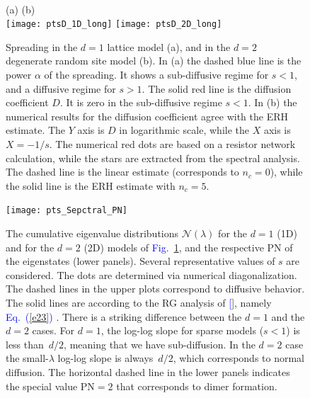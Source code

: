 \documentclass[aps,prb,floats,floatfix,twocolumn]{revtex4}
\newcommand{\Eq}[1]{\textcolor{blue}{Eq.\!\!~(\ref{#1})}}
\newcommand{\Fig}[1]{\textcolor{blue}{Fig.}\!\!~\ref{#1}}
\renewcommand{\cite}[1]{\textcolor{blue}{[\onlinecite{#1}}]} %
\begin{document}
 


\begin{widetext}

\ \\ \ \\ \ \\ \ \\ \ \\ \ \\ 



\begin{figure}[h!]
(a) \hspace{0.5\hsize} (b) \\
\texttt{[image: ptsD\_1D\_long]}
\texttt{[image: ptsD\_2D\_long]}

\caption{Spreading in the $d{=}1$ lattice model (a), 
and in the $d{=}2$ degenerate random site model (b). 
In (a) the dashed blue line is the power $\alpha$ of the spreading. 
It shows a sub-diffusive regime for $s<1$, and a diffusive regime for $s>1$. 
The solid red line is the diffusion coefficient $D$. 
It is zero in the sub-diffusive regime $s<1$. 
In (b) the numerical results for the diffusion coefficient agree 
with the ERH estimate. The $Y$ axis is $D$ in logarithmic scale, while the $X$ axis is $X=-1/s$. 
The numerical red dots are based on a resistor network calculation, 
while the stars are extracted from the spectral analysis.  
The dashed line is the linear estimate (corresponds to ${n_c = 0}$), 
while the solid line is the ERH estimate with ${n_c = 5}$.
}
\label{f1}
\end{figure}



\begin{figure}[H]
\texttt{[image: pts\_Sepctral\_PN]}

\caption{ 
The cumulative eigenvalue distributions $\mathcal{N}(\lambda)$ 
for the $d{=}1$ (1D) and for the $d{=}2$ (2D) models of \Fig{f1}, 
and the respective PN of the eigenstates (lower panels).
Several representative values of $s$ are considered.
% 
The dots are determined via numerical diagonalization. 
The dashed lines in the upper plots correspond to diffusive behavior.  
The solid lines are according to the RG analysis of \cite{amir}, namely \Eq{e23} . 
%
There is a striking difference between the $d{=}1$ and the $d{=}2$ cases. 
For $d{=}1$, the log-log slope for sparse models ($s<1$) is less than~$d/2$, 
meaning that we have sub-diffusion. In the $d{=}2$ case the small-$\lambda$ log-log slope 
is always~$d/2$, which corresponds to normal diffusion.
%
The horizontal dashed line in the lower panels indicates 
the special value PN$=2$ that corresponds to dimer formation.
} 
\label{f2}
\end{figure}



\end{widetext}
\end{document}
